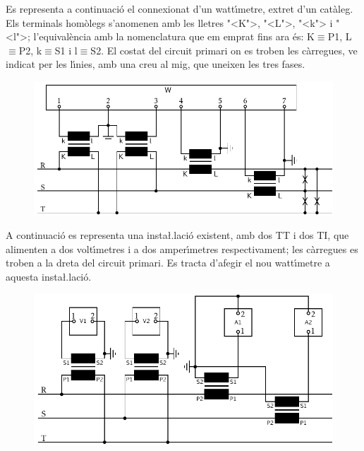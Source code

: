 \begin{exemple}

Es representa a continuaci\'{o} el connexionat d'un watt\'{\i}metre, extret
d'un cat\`{a}leg. Els terminals hom\`{o}legs s'anomenen amb les lletres {"<}K{">},
{"<}L{">}, {"<}k{">} i {"<}l{">}; l'equival\`{e}ncia amb la nomenclatura que em emprat
fins ara \'{e}s: K$\equiv$P1, L$\equiv$P2, k$\equiv$S1 i l$\equiv$S2. El
costat del circuit primari on es troben les c\`{a}rregues, ve indicat
per les l\'{\i}nies, amb una creu al mig, que uneixen les tres fases.

\begin{figure}[h]
\centering
    \includegraphics{Imatges/Cap-TrafosMesProt-Watt.pdf}
\end{figure}

A continuaci\'{o} es representa una insta{\l.l}aci\'{o} existent, amb dos TT i
dos TI, que alimenten a dos volt\'{\i}metres i a dos amper\'{\i}metres
respectivament; les c\`{a}rregues es troben a la dreta del circuit
primari. Es tracta d'afegir el nou watt\'{\i}metre a aquesta
insta{\l.l}aci\'{o}.

\begin{figure}[h]
\centering
    \includegraphics{Imatges/Cap-TrafosMesProt-Instal.pdf}
\end{figure}


\end{exemple}
